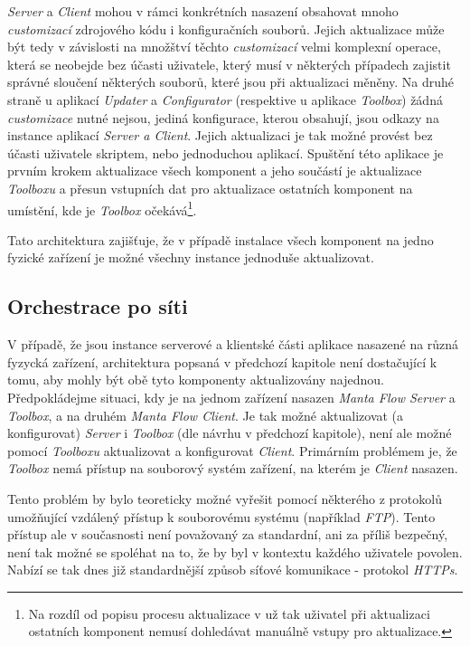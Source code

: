 \textit{Server} a \textit{Client} mohou v rámci konkrétních nasazení obsahovat mnoho \textit{customizací} zdrojového kódu i konfiguračních souborů. Jejich aktualizace může být tedy v závislosti na množštví těchto \textit{customizací} velmi komplexní operace, která se neobejde bez účasti uživatele, který musí v některých případech zajistit správné sloučení některých souborů, které jsou při aktualizaci měněny. Na druhé straně u aplikací \textit{Updater} a \textit{Configurator} (respektive u aplikace \textit{Toolbox}) žádná \textit{customizace} nutné nejsou, jediná konfigurace, kterou obsahují, jsou odkazy na instance aplikací \textit{Server a Client}. Jejich aktualizaci je tak možné provést bez účasti uživatele skriptem, nebo jednoduchou aplikací. Spuštění této aplikace je prvním krokem aktualizace všech komponent a jeho součástí je aktualizace \textit{Toolboxu} a přesun vstupních dat pro aktualizace ostatních komponent na umístění, kde je \textit{Toolbox} očekává\footnote{Na rozdíl od popisu procesu aktualizace v \cite{Gondek16} už tak uživatel při aktualizaci ostatních komponent nemusí dohledávat manuálně vstupy pro aktualizace.}.

Tato architektura zajišťuje, že v případě instalace všech komponent na jedno fyzické zařízení je možné všechny instance jednoduše aktualizovat.

\subsection{Orchestrace po síti}
\label{sec:des_orchestration_multinode}
V případě, že jsou instance serverové a klientské části aplikace nasazené na různá fyzycká zařízení, architektura popsaná v předchozí kapitole není dostačující k tomu, aby mohly být obě tyto komponenty aktualizovány najednou.
Předpokládejme situaci, kdy je na jednom zařízení nasazen \textit{Manta Flow Server} a \textit{Toolbox}, a na druhém \textit{Manta Flow Client}. Je tak možné aktualizovat (a konfigurovat) \textit{Server} i \textit{Toolbox} (dle návrhu v předchozí kapitole), není ale možné pomocí \textit{Toolboxu} aktualizovat a konfigurovat \textit{Client}. Primárním problémem je, že \textit{Toolbox} nemá přístup na souborový systém zařízení, na kterém je \textit{Client} nasazen.

Tento problém by bylo teoreticky možné vyřešit pomocí některého z protokolů umožňující vzdálený přístup k souborovému systému (například \textit{FTP}). Tento přístup ale v současnosti není považovaný za standardní, ani za příliš bezpečný, není tak možné se spoléhat na to, že by byl v kontextu každého uživatele povolen. Nabízí se tak dnes již standardnější způsob síťové komunikace - protokol \textit{HTTPs}.

